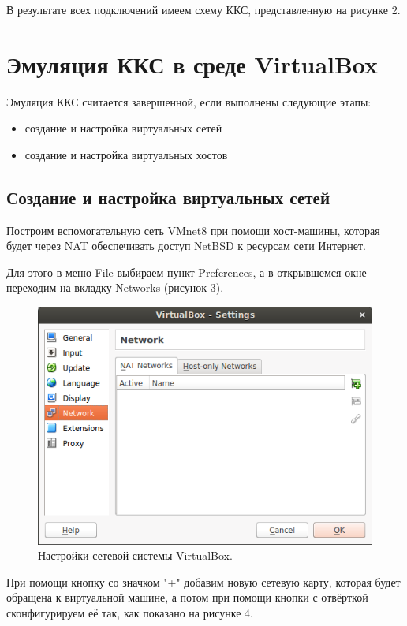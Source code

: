 В результате всех подключений имеем схему ККС, представленную на рисунке 2.

\newpage
\section{Эмуляция ККС в среде VirtualBox}

Эмуляция ККС считается завершенной, если выполнены следующие этапы:
\begin{itemize}
\item создание и настройка виртуальных сетей
\item создание и настройка виртуальных хостов
\end{itemize}

\subsection{Создание и настройка виртуальных сетей}

Построим вспомогательную сеть VMnet8 при помощи хост-машины, которая будет через NAT обеспечивать доступ NetBSD к ресурсам сети Интернет.

Для этого в меню File выбираем пункт Preferences, а в открывшемся окне переходим на вкладку Networks (рисунок 3).

\begin{figure}[h!]
\centering
\includegraphics[scale=0.8]{res/virtualbox-networks}
\caption{Настройки сетевой системы VirtualBox.}
\end{figure}

При помощи кнопку со значком "+" добавим новую сетевую карту, которая будет обращена к виртуальной машине, а потом при помощи кнопки с отвёрткой сконфигурируем её так, как показано на рисунке 4.

